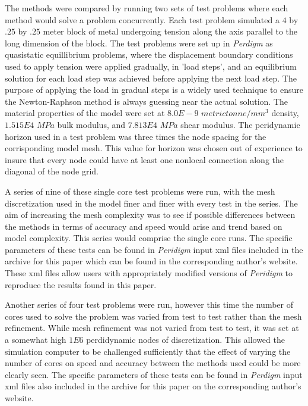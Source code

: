 \documentclass[preprint,12pt]{elsarticle}
\begin{document}
The methods were compared by running two sets of test problems where each method would solve a
problem concurrently. Each test problem simulated a $4$ by $.25$ by $.25$ meter block of metal
undergoing tension along the axis parallel to the long dimension of the block. The test problems
were set up in \emph{Perdigm} as quasistatic equillibrium problems, where the displacement boundary
conditions used to apply tension were applied gradually, in 'load steps', and an equilibrium
solution for each load step was achieved before applying the next load step. The purpose of applying
the load in gradual steps is a widely used technique to ensure the Newton-Raphson method is always
guessing near the actual solution. The material properties of the model were set at $8.0E-9$ $ metric
tonne/ mm^3$ density, $1.515E4$ $MPa$ bulk modulus, and $7.813E4$ $MPa$ shear modulus. The peridynamic
horizon used in a test problem was three times the node spacing for the corrisponding model mesh.
This value for horizon was chosen out of experience to insure that every node could have at least
one nonlocal connection along the diagonal of the node grid.

A series of nine of these single core test problems were run, with the mesh discretization used in
the model finer and finer with every test in the series. The aim of increasing the mesh complexity
was to see if possible differences between the methods in terms of accuracy and speed would arise
and trend based on model complexity. This series would comprise the single core runs. The specific
parameters of these tests can be found in \emph{Peridigm} input xml files included in the archive
for this paper which can be found in the corresponding author's website. These xml files allow users
with appropriately modified versions of \emph{Peridigm} to reproduce the results found in this
paper.

Another series of four test problems were run, however this time the number of cores used to solve
the problem was varied from test to test rather than the mesh refinement. While mesh refinement was
not varied from test to test, it was set at a somewhat high $1E6$ perdidynamic nodes of
discretization. This allowed the simulation computer to be challenged sufficiently that the effect
of varying the number of cores on speed and accuracy between the methods used could be more clearly
seen. The specific parameters of these tests can be found in \emph{Perdigm} input xml files also
included in the archive for this paper on the corresponding author's website.
\end{document}
